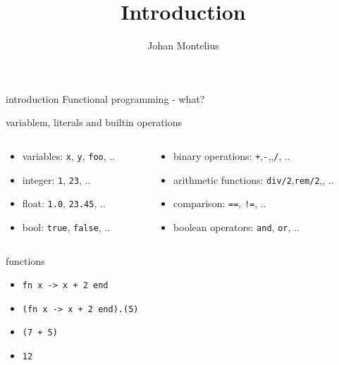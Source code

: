 


\title[ID1019 Introduction]{Introduction}

\author{Johan Montelius}
\date{\semester}



\begin{frame}
\titlepage
\end{frame}

\begin{frame}{introduction}
  Functional programming - what?
\end{frame}

\begin{frame}{variablem, literals and builtin operations}
\begin{columns}
 \begin{column}{0.4\linewidth}
   \begin{itemize}
     \pause \item {variables:} {\tt x}, {\tt y}, {\tt foo}, ..
     \pause \item {integer:} {\tt 1}, {\tt 23}, ..
     \pause \item {float:} {\tt 1.0}, {\tt 23.45}, ..
     \pause \item {bool:} {\tt true}, {\tt false}, ..
   \end{itemize}
 \end{column}
 \begin{column}{0.6\linewidth}
  \begin{itemize}
    \pause \item {binary operations:} {\tt +},{\tt -},{\tt *},{\tt /}, ..
    \pause \item {arithmetic functions:} {\tt div/2},{\tt rem/2},{\tt *}, ..   
    \pause \item {comparison:} {\tt ==}, {\tt !=}, ..
    \pause \item {boolean operators:} {\tt and}, {\tt or}, ..
  \end{itemize}
 \end{column}
\end{columns}

\vspace{20pt}{\em There are more but this is fine for now.}

\end{frame}


\begin{frame}{functions}
  \begin{itemize}
   \pause \item {\tt fn x -> x + 2 end}
   \pause \item {\tt (fn x -> x + 2 end).(5)}
   \pause \item {\tt (7 + 5)}
   \pause \item {\tt 12}
  \end{itemize}


\vspace{20pt}{\em Can we give names to functions?}  
\end{frame}

